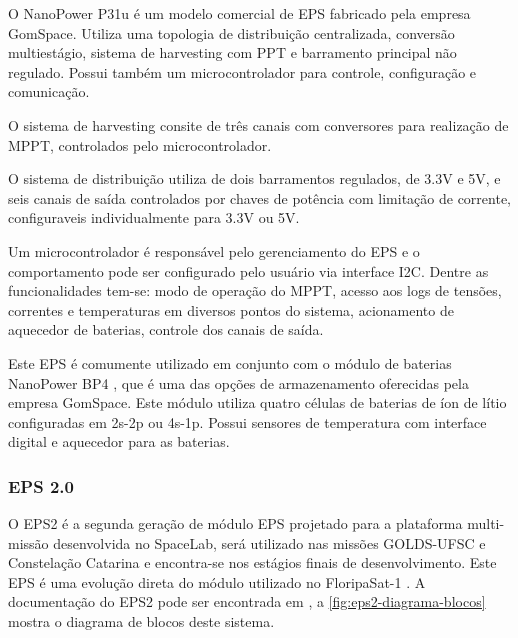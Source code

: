 O NanoPower P31u \cite{p31u-datasheet} é um modelo comercial de \gls{EPS} fabricado pela empresa GomSpace. Utiliza uma topologia de distribuição centralizada, conversão multiestágio, sistema de harvesting com \gls{PPT} e barramento principal não regulado. Possui também um microcontrolador para controle, configuração e comunicação.

O sistema de harvesting consite de três canais com conversores para realização de \gls{MPPT}, controlados pelo microcontrolador.

O sistema de distribuição utiliza de dois barramentos regulados, de 3.3V e 5V, e seis canais de saída controlados por chaves de potência com limitação de corrente, configuraveis individualmente para 3.3V ou 5V.

Um microcontrolador é responsável pelo gerenciamento do \gls{EPS} e o comportamento pode ser configurado pelo usuário via interface \gls{I2C}.
Dentre as funcionalidades tem-se: modo de operação do \gls{MPPT}, acesso aos logs de tensões, correntes e temperaturas em diversos pontos do sistema, acionamento de aquecedor de baterias, controle dos canais de saída.

Este EPS é comumente utilizado em conjunto com o módulo de baterias NanoPower BP4 \cite{bp4-datasheet}, que é uma das opções de armazenamento oferecidas pela empresa GomSpace.
Este módulo utiliza quatro células de baterias de íon de lítio configuradas em 2s-2p ou 4s-1p. Possui sensores de temperatura com interface digital e aquecedor para as baterias.



\subsubsection{EPS 2.0}

O \gls{EPS2} é a segunda geração de módulo \gls{EPS} projetado para a plataforma multi-missão desenvolvida no SpaceLab, será utilizado nas missões GOLDS-UFSC e Constelação Catarina e encontra-se nos estágios finais de desenvolvimento. Este \gls{EPS} é uma evolução direta do módulo utilizado no FloripaSat-1 \cite{floripasat-1}. A documentação do \gls{EPS2} pode ser encontrada em \cite{eps2-doc}, a \autoref{fig:eps2-diagrama-blocos} mostra o diagrama de blocos deste sistema.

